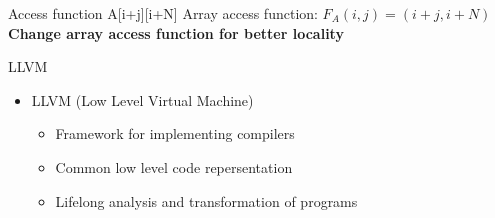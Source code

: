 \documentclass{beamer}
\begin{document}
\begin{frame}{Access function}
A[i+j][i+N]
\linebreak\linebreak
Array access function: $F_A(i,j) = (i+j,i+N)$ 
\linebreak\linebreak
{\textbf {Change array access function for better locality}} \\
\end{frame}


\begin{frame}{LLVM}
\begin{itemize}
\item LLVM (Low Level Virtual Machine)
	\begin{itemize}
	\item Framework for implementing compilers
	\item Common low level code repersentation
	\item Lifelong analysis and transformation of programs
	\end{itemize}
\end{itemize}
\end{frame}
\end{document}
